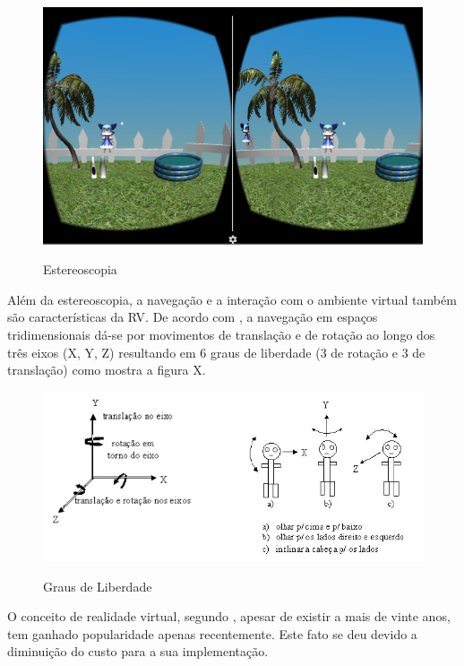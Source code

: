 \begin{figure}[H]
	\caption{\small Estereoscopia}
	\centering
	\includegraphics[scale=0.7]{Imagens/estereoscopia.png}
	\label{f.estereoscopia}
\end{figure}

Além da estereoscopia, a navegação e a interação com o ambiente virtual também são características da RV. De acordo com , a navegação em espaços tridimensionais dá-se por movimentos de translação e de rotação ao longo dos três eixos (X, Y, Z) resultando em 6 graus de liberdade (3 de rotação e 3 de translação) como mostra a figura X. 

\begin{figure}[ht]
	\caption{\small Graus de Liberdade}
	\centering
	\includegraphics[scale=1.0]{Imagens/grausliberdade.png}
	\label{f.grausliberdade}
\end{figure}

O conceito de realidade virtual, segundo , apesar de existir a mais de vinte anos, tem ganhado popularidade apenas recentemente. Este fato se deu devido a diminuição do custo para a sua implementação.

